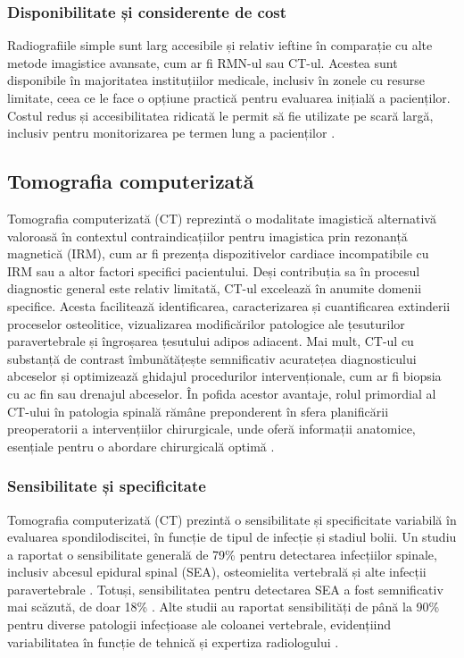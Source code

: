 \message{ !name(LaMain.tex)}\documentclass[romanian,12pt,a4paper]{article}
\begin{document}
\subsubsection{Disponibilitate și considerente de cost}

Radiografiile simple sunt larg accesibile și relativ ieftine în
comparație cu alte metode imagistice avansate, cum ar fi RMN-ul sau
CT-ul. Acestea sunt disponibile în majoritatea instituțiilor medicale,
inclusiv în zonele cu resurse limitate, ceea ce le face o opțiune
practică pentru evaluarea inițială a pacienților. Costul redus și
accesibilitatea ridicată le permit să fie utilizate pe scară largă,
inclusiv pentru monitorizarea pe termen lung a pacienților
\cite{ImagingSpondylodiscitisComprehensive2024}.

\subsection{Tomografia computerizată}

Tomografia computerizată (CT) reprezintă o modalitate imagistică
alternativă valoroasă în contextul contraindicațiilor pentru imagistica
prin rezonanță magnetică (IRM), cum ar fi prezența dispozitivelor
cardiace incompatibile cu IRM sau a altor factori specifici pacientului.
Deși contribuția sa în procesul diagnostic general este relativ
limitată, CT-ul excelează în anumite domenii specifice. Acesta
facilitează identificarea, caracterizarea și cuantificarea extinderii
proceselor osteolitice, vizualizarea modificărilor patologice ale
țesuturilor paravertebrale și îngroșarea țesutului adipos adiacent. Mai
mult, CT-ul cu substanță de contrast îmbunătățește semnificativ
acuratețea diagnosticului abceselor și optimizează ghidajul procedurilor
intervenționale, cum ar fi biopsia cu ac fin sau drenajul abceselor. În
pofida acestor avantaje, rolul primordial al CT-ului în patologia
spinală rămâne preponderent în sfera planificării preoperatorii a
intervențiilor chirurgicale, unde oferă informații anatomice, esențiale
pentru o abordare chirurgicală optimă
\cite{DiagnosticInterventionalManagement2020}.

\subsubsection{Sensibilitate și specificitate}

Tomografia computerizată (CT) prezintă o sensibilitate și specificitate
variabilă în evaluarea spondilodiscitei, în funcție de tipul de infecție
și stadiul bolii. Un studiu a raportat o sensibilitate generală de 79\%
pentru detectarea infecțiilor spinale, inclusiv abcesul epidural spinal
(SEA), osteomielita vertebrală și alte infecții paravertebrale
\cite{ImagingCharacteristicsCT2022}. Totuși, sensibilitatea pentru
detectarea SEA a fost semnificativ mai scăzută, de doar 18\%
\cite{ImagingCharacteristicsCT2022}. Alte studii au raportat
sensibilități de până la 90\% pentru diverse patologii infecțioase ale
coloanei vertebrale, evidențiind variabilitatea în funcție de tehnică și
expertiza radiologului \cite{ImagingAssessmentSpine2024}.
\end{document}
